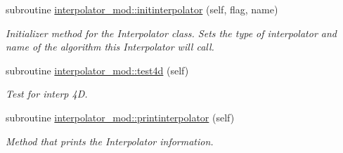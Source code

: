 \begin{DoxyCompactItemize}
subroutine \mbox{\hyperlink{namespaceinterpolator__mod_adcaf3bba800f19991ed4f33c968184e9}{interpolator\+\_\+mod\+::initinterpolator}} (self, flag, name)
\begin{DoxyCompactList}\small\item\em Initializer method for the Interpolator class. Sets the type of interpolator and name of the algorithm this Interpolator will call. \end{DoxyCompactList}\item 
subroutine \mbox{\hyperlink{namespaceinterpolator__mod_ac27ad06522b34071302dc09d10b0ec7e}{interpolator\+\_\+mod\+::test4d}} (self)
\begin{DoxyCompactList}\small\item\em Test for interp 4D. \end{DoxyCompactList}\item 
subroutine \mbox{\hyperlink{namespaceinterpolator__mod_a9b149bc8a3da5d1864b8c049f8b00697}{interpolator\+\_\+mod\+::printinterpolator}} (self)
\begin{DoxyCompactList}\small\item\em Method that prints the Interpolator information. \end{DoxyCompactList}\end{DoxyCompactItemize}
